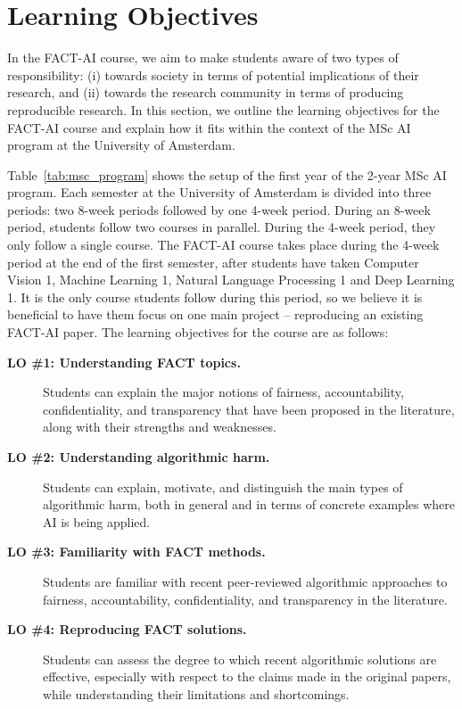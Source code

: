 \documentclass[letterpaper]{article}
\newcommand{\OurUniversity}{the University of Amsterdam}
\begin{document}
\section{Learning Objectives}
\label{section:learning-objectives}

In the FACT-AI course, we aim to make students aware of two types of responsibility: (i) towards society in terms of potential implications of their research, and (ii) towards the research community in terms of producing reproducible research. 
In this section, we outline the learning objectives for the FACT-AI course and explain how it fits within the context of the MSc AI program at \OurUniversity{}. 

Table~\ref{tab:msc_program} shows the setup of the first year of the 2-year MSc AI program. Each semester at \OurUniversity{} is divided into three periods: two 8-week periods followed by one 4-week period. During an 8-week period, students follow two courses in parallel. During the 4-week period, they only follow a single course. 
The FACT-AI course takes place during the 4-week period at the end of the first semester, after students have taken Computer Vision 1, Machine Learning 1, Natural Language Processing 1 and Deep Learning 1. 
It is the only course students follow during this period, so we believe it is beneficial to have them focus on one main project -- reproducing an existing FACT-AI paper. 
The learning objectives for the course are as follows: 
\begin{description}
	\item[\textbf{LO \#1: Understanding FACT topics.}] Students can explain the major notions of fairness, accountability, confidentiality, and transparency that have been proposed in the literature, along with their strengths and weaknesses.
	\item[\textbf{LO \#2: Understanding algorithmic harm.}] Students can explain, motivate, and distinguish the main types of algorithmic harm, both in general and in terms of concrete examples where AI is being applied.
	\item[\textbf{LO \#3: Familiarity with FACT methods.}] Students are familiar with recent peer-reviewed algorithmic approaches to fairness, accountability, confidentiality, and transparency in the literature. 
    \item[\textbf{LO \#4: Reproducing FACT solutions.}] Students can assess the degree to which recent algorithmic solutions are effective, especially with respect to the claims made in the original papers, while understanding their limitations and shortcomings. 
\end{description}
\fi
\end{document}
